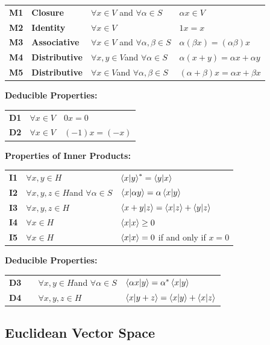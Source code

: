 \documentclass[12pt]{book}
\begin{document}
\begin{table}
\begin{center}
\begin{tabular}{llll}
  {\bf M1} & {\bf Closure} & $\forall x \in V$ and $\forall \alpha \in S$ & $\alpha x \in V$\\
  {\bf M2} & {\bf Identity} & $\forall x \in V$ & $1x=x$\\
  {\bf M3} & {\bf Associative} & $\forall x \in V$
and $\forall \alpha,\beta \in S$ & $\alpha(\beta x) = (\alpha \beta) x$\\
{\bf M4} & {\bf Distributive} & $\forall x,y \in V$and $\forall \alpha \in S$ & $\alpha(x+y) = \alpha x + \alpha y$ \\
  {\bf M5} & {\bf Distributive} & $\forall x \in V$and $\forall \alpha,\beta \in S$ & $ (\alpha + \beta)x = \alpha x + \beta x $ \\
\end{tabular}
\vskip 0.5cm
{\bf Deducible Properties:}\\
\begin{tabular}{lll}
{\bf D1}  & $\forall x \in V $  & $0x = 0$ \\
{\bf D2}  & $\forall x \in V $  & $(-1)x = (-x)$ \\
\end{tabular}
\vskip 0.5cm
{\bf Properties of Inner Products:}\\
\begin{tabular}{lll}
  {\bf I1} & $\forall x,y \in H$ & $\braket{x|y}^* = \braket{y|x}$\\
{\bf I2} & $\forall x,y,z \in H$and $\forall \alpha \in S$ &
$\braket{x|\alpha y} = \alpha \braket{x|y}$\\
{\bf I3} & $\forall x,y,z \in H$ & $\braket{x+y|z} = \braket{x|z}+\braket{y|z}$\\
{\bf I4} & $\forall x \in H$ & $\braket{x|x} \geq 0$ \\
{\bf I5} & $\forall x \in H$ & $\braket{x|x}=0$ if and only if $x=0$ \\
\end{tabular}
\vskip 0.5cm
{\bf Deducible Properties:}\\
\begin{tabular}{llll}
{\bf D3} & & $\forall x,y \in H$and $\forall \alpha \in S$ &
$\braket{\alpha x|y} = \alpha^* \braket{x|y}$\\
{\bf D4} & & $\forall x,y,z \in H$ &
$\braket{x|y+z} = \braket{x|y}+\braket{x|z}$\\
\end{tabular}
\end{center}
\end{table}

\subsection{Euclidean Vector Space}
\end{document}
